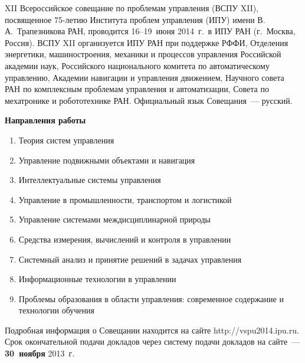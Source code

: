      
 { %
 XII Всероссийское совещание по проблемам управления (ВСПУ XII), посвященное 75-летию 
Института проблем управления (ИПУ) имени В.\,А.~Трапезникова РАН, проводится 16--19~июня 
2014~г.\ 
в ИПУ РАН (г.~Москва, Россия). ВСПУ XII организуется ИПУ РАН при поддержке РФФИ, Отделения 
энергетики, машиностроения, механики и процессов управления Российской академии наук, 
Российского 
национального комитета по автоматическому управлению, Академии навигации и управ\-ле\-ния 
движением, 
Научного совета РАН по комплексным проблемам управления и автоматизации, Совета по 
мехатронике и робототехнике РАН. Официальный язык Совещания~--- русский.

\vspace*{24pt}
     
     \textbf{Направления работы}
     \begin{enumerate}[1.]
\item Теория систем управления
\item Управление подвижными объектами и навигация
\item Интеллектуальные системы управления
\item Управление в промышленности, транспортом и логистикой
\item Управление системами междисциплинарной природы
\item Средства измерения, вычислений и контроля в управлении
\item Системный анализ и принятие решений в задачах управления
\item Информационные технологии в управлении
\item Проблемы образования в области управления: современное содержание и технологии обучения
\end{enumerate}

\vspace*{24pt}

     Подробная информация о Совещании находится на сайте {\sf http://vspu2014.ipu.ru}. Срок 
окончательной подачи докладов через систему подачи докладов на сайте~--- \textbf{30~ноября} 
2013~г.
}